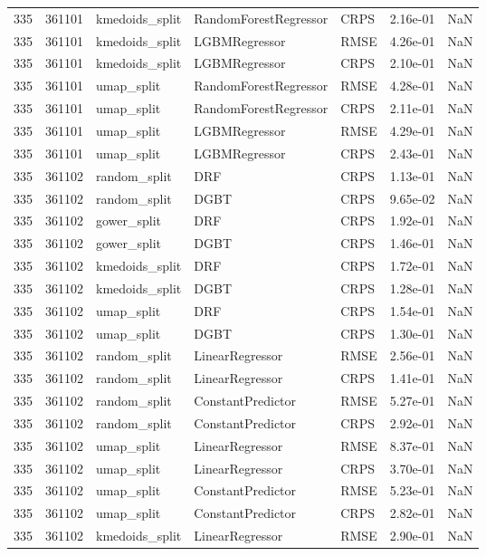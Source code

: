 \begin{tabular}{rrlllrr}
335 & 361101 & kmedoids\_split & RandomForestRegressor & CRPS & 2.16e-01 & NaN \\
335 & 361101 & kmedoids\_split & LGBMRegressor & RMSE & 4.26e-01 & NaN \\
335 & 361101 & kmedoids\_split & LGBMRegressor & CRPS & 2.10e-01 & NaN \\
335 & 361101 & umap\_split & RandomForestRegressor & RMSE & 4.28e-01 & NaN \\
335 & 361101 & umap\_split & RandomForestRegressor & CRPS & 2.11e-01 & NaN \\
335 & 361101 & umap\_split & LGBMRegressor & RMSE & 4.29e-01 & NaN \\
335 & 361101 & umap\_split & LGBMRegressor & CRPS & 2.43e-01 & NaN \\
335 & 361102 & random\_split & DRF & CRPS & 1.13e-01 & NaN \\
335 & 361102 & random\_split & DGBT & CRPS & 9.65e-02 & NaN \\
335 & 361102 & gower\_split & DRF & CRPS & 1.92e-01 & NaN \\
335 & 361102 & gower\_split & DGBT & CRPS & 1.46e-01 & NaN \\
335 & 361102 & kmedoids\_split & DRF & CRPS & 1.72e-01 & NaN \\
335 & 361102 & kmedoids\_split & DGBT & CRPS & 1.28e-01 & NaN \\
335 & 361102 & umap\_split & DRF & CRPS & 1.54e-01 & NaN \\
335 & 361102 & umap\_split & DGBT & CRPS & 1.30e-01 & NaN \\
335 & 361102 & random\_split & LinearRegressor & RMSE & 2.56e-01 & NaN \\
335 & 361102 & random\_split & LinearRegressor & CRPS & 1.41e-01 & NaN \\
335 & 361102 & random\_split & ConstantPredictor & RMSE & 5.27e-01 & NaN \\
335 & 361102 & random\_split & ConstantPredictor & CRPS & 2.92e-01 & NaN \\
335 & 361102 & umap\_split & LinearRegressor & RMSE & 8.37e-01 & NaN \\
335 & 361102 & umap\_split & LinearRegressor & CRPS & 3.70e-01 & NaN \\
335 & 361102 & umap\_split & ConstantPredictor & RMSE & 5.23e-01 & NaN \\
335 & 361102 & umap\_split & ConstantPredictor & CRPS & 2.82e-01 & NaN \\
335 & 361102 & kmedoids\_split & LinearRegressor & RMSE & 2.90e-01 & NaN \\

\end{tabular}
